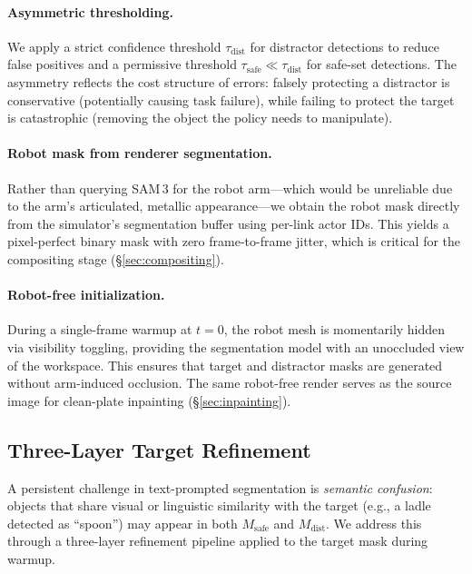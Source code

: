 \paragraph{Asymmetric thresholding.}
We apply a strict confidence threshold $\tau_{\text{dist}}$ for distractor detections to reduce false positives and a permissive threshold $\tau_{\text{safe}} \ll \tau_{\text{dist}}$ for safe-set detections. The asymmetry reflects the cost structure of errors: falsely protecting a distractor is conservative (potentially causing task failure), while failing to protect the target is catastrophic (removing the object the policy needs to manipulate).

\paragraph{Robot mask from renderer segmentation.}
Rather than querying SAM\,3 for the robot arm---which would be unreliable due to the arm's articulated, metallic appearance---we obtain the robot mask directly from the simulator's segmentation buffer using per-link actor IDs. This yields a pixel-perfect binary mask with zero frame-to-frame jitter, which is critical for the compositing stage (\S\ref{sec:compositing}).

\paragraph{Robot-free initialization.}
During a single-frame warmup at $t{=}0$, the robot mesh is momentarily hidden via visibility toggling, providing the segmentation model with an unoccluded view of the workspace. This ensures that target and distractor masks are generated without arm-induced occlusion. The same robot-free render serves as the source image for clean-plate inpainting (\S\ref{sec:inpainting}).

\subsection{Three-Layer Target Refinement}
\label{sec:refinement}

A persistent challenge in text-prompted segmentation is \emph{semantic confusion}: objects that share visual or linguistic similarity with the target (e.g., a ladle detected as ``spoon'') may appear in both $M_{\text{safe}}$ and $M_{\text{dist}}$. We address this through a three-layer refinement pipeline applied to the target mask during warmup.

